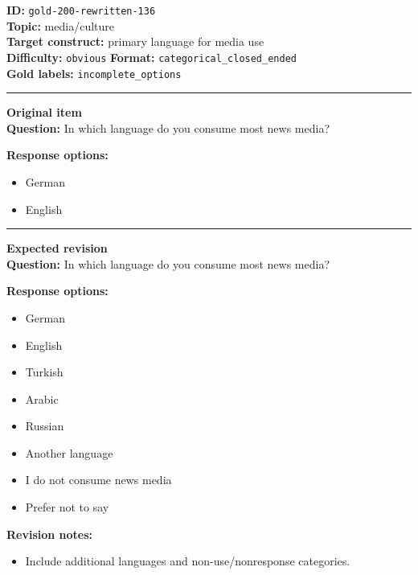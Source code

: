 \documentclass[10pt,a4paper]{article}
\newcommand{\sectionline}{\vspace{0.15em}\hrule\vspace{0.35em}}
\begin{document}
\begin{tcolorbox}[colframe=FlawRed,colback=white,colbacktitle=FlawRed!9,coltitle=black,title={Item 136\hfill Flawed item}]
\textbf{ID:} \texttt{gold-200-rewritten-136}\\
\textbf{Topic:} media/culture\\
\textbf{Target construct:} primary language for media use\\
\textbf{Difficulty:} \texttt{obvious} \quad \textbf{Format:} \texttt{categorical\_closed\_ended}\\
\textbf{Gold labels:} \texttt{incomplete\_options}\\
\sectionline
\textbf{Original item}\\
\textbf{Question:} In which language do you consume most news media?
\par\textbf{Response options:}
\begin{itemize}
\item German
\item English
\end{itemize}
\sectionline
\textbf{Expected revision}\\
\textbf{Question:} In which language do you consume most news media?
\par\textbf{Response options:}
\begin{itemize}
\item German
\item English
\item Turkish
\item Arabic
\item Russian
\item Another language
\item I do not consume news media
\item Prefer not to say
\end{itemize}
\par\textbf{Revision notes:}
\begin{itemize}
\item Include additional languages and non-use/nonresponse categories.
\end{itemize}
\end{tcolorbox}
\end{document}
